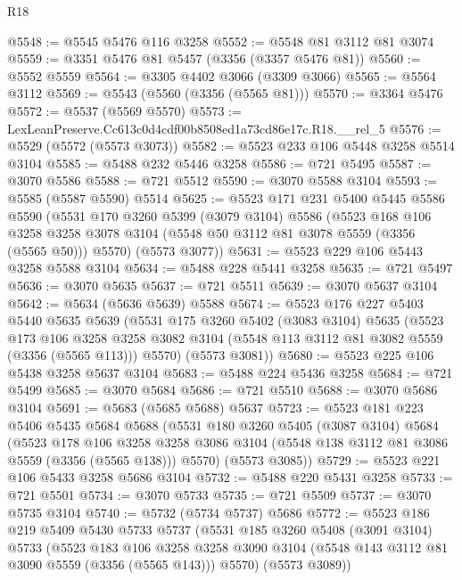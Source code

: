 \begin{lexlean}{R18}
\begin{coremodule}
@5548 := @5545 @5476 @116 @3258
@5552 := @5548 @81 @3112 @81 @3074
@5559 := @3351 @5476 @81 @5457 (@3356 (@3357 @5476 @81))
@5560 := @5552 @5559
@5564 := @3305 @4402 @3066 (@3309 @3066)
@5565 := @5564 @3112
@5569 := @5543 (@5560 (@3356 (@5565 @81)))
@5570 := @3364 @5476
@5572 := @5537 (@5569 @5570)
@5573 := LexLeanPreserve.Cc613c0d4cdf00b8508ed1a73cd86e17c.R18.__rel_5
@5576 := @5529 (@5572 (@5573 @3073))
@5582 := @5523 @233 @106 @5448 @3258 @5514 @3104
@5585 := @5488 @232 @5446 @3258
@5586 := @721 @5495
@5587 := @3070 @5586
@5588 := @721 @5512
@5590 := @3070 @5588 @3104
@5593 := @5585 (@5587 @5590) @5514
@5625 := @5523
    @171
    @231
    @5400
    @5445
    @5586
    @5590
    (@5531
      @170
      @3260
      @5399
      (@3079 @3104)
      @5586
      (@5523
        @168
        @106
        @3258
        @3258
        @3078
        @3104
        (@5548 @50 @3112 @81 @3078 @5559 (@3356 (@5565 @50)))
        @5570)
      (@5573 @3077))
@5631 := @5523 @229 @106 @5443 @3258 @5588 @3104
@5634 := @5488 @228 @5441 @3258
@5635 := @721 @5497
@5636 := @3070 @5635
@5637 := @721 @5511
@5639 := @3070 @5637 @3104
@5642 := @5634 (@5636 @5639) @5588
@5674 := @5523
    @176
    @227
    @5403
    @5440
    @5635
    @5639
    (@5531
      @175
      @3260
      @5402
      (@3083 @3104)
      @5635
      (@5523
        @173
        @106
        @3258
        @3258
        @3082
        @3104
        (@5548 @113 @3112 @81 @3082 @5559 (@3356 (@5565 @113)))
        @5570)
      (@5573 @3081))
@5680 := @5523 @225 @106 @5438 @3258 @5637 @3104
@5683 := @5488 @224 @5436 @3258
@5684 := @721 @5499
@5685 := @3070 @5684
@5686 := @721 @5510
@5688 := @3070 @5686 @3104
@5691 := @5683 (@5685 @5688) @5637
@5723 := @5523
    @181
    @223
    @5406
    @5435
    @5684
    @5688
    (@5531
      @180
      @3260
      @5405
      (@3087 @3104)
      @5684
      (@5523
        @178
        @106
        @3258
        @3258
        @3086
        @3104
        (@5548 @138 @3112 @81 @3086 @5559 (@3356 (@5565 @138)))
        @5570)
      (@5573 @3085))
@5729 := @5523 @221 @106 @5433 @3258 @5686 @3104
@5732 := @5488 @220 @5431 @3258
@5733 := @721 @5501
@5734 := @3070 @5733
@5735 := @721 @5509
@5737 := @3070 @5735 @3104
@5740 := @5732 (@5734 @5737) @5686
@5772 := @5523
    @186
    @219
    @5409
    @5430
    @5733
    @5737
    (@5531
      @185
      @3260
      @5408
      (@3091 @3104)
      @5733
      (@5523
        @183
        @106
        @3258
        @3258
        @3090
        @3104
        (@5548 @143 @3112 @81 @3090 @5559 (@3356 (@5565 @143)))
        @5570)
      (@5573 @3089))

\end{coremodule}
\end{lexlean}
